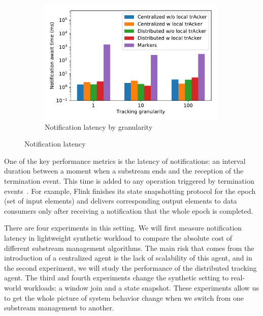 \begin{figure}[t!]
\begin{subfigure}[b]{0.32\textwidth}
            \label{notification_machines}
    \end{subfigure}
    \hspace{5mm}
    \begin{subfigure}[b]{0.32\textwidth}
            \includegraphics[width=0.99\textwidth]{pics/notification_await_time_by_tracking_frequency_bars.pdf}
            \caption{Notification latency by granularity}
            \label{notification_granularity}
    \end{subfigure}
    \caption{Notification latency}
    \label{notification_latency}
\end{figure}

One of the key performance metrics is the latency of notifications: an interval duration between a moment when a substream ends and the reception of the termination event. This time is added to any operation triggered by termination events~\cite{Carbone:2017:SMA:3137765.3137777, we2018adbis}. For example, Flink finishes its state snapshotting protocol for the epoch (set of input elements) and delivers corresponding output elements to data consumers only after receiving a notification that the whole epoch is completed.

There are four experiments in this setting. We will first measure notification latency in lightweight synthetic workload to compare the absolute cost of different substream management algorithms. The main risk that comes from the introduction of a centralized agent is the lack of scalability of this agent, and in the second experiment, we will study the performance of the distributed tracking agent. The third and fourth experiments change the synthetic setting to real-world workloads: a window join and a state snapshot. These experiments allow us to get the whole picture of system behavior change when we switch from one substream management to another.

